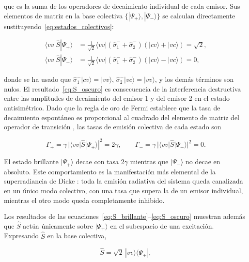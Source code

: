 que es la suma de los operadores de decaimiento individual de cada emisor. Sus elementos de matriz en la base colectiva $\{|\Psi_+\rangle, |\Psi_-\rangle\}$ se calculan directamente sustituyendo~\eqref{eq:estados_colectivos}:

\begin{align}
	\langle vv|\hat{S}|\Psi_+\rangle
	&= \frac{1}{\sqrt{2}}\langle vv|
	\left(\hat{\sigma}_1^- + \hat{\sigma}_2^-\right)
	\left(|cv\rangle + |vc\rangle\right)
	= \sqrt{2},
	\label{eq:S_brillante}\\[4pt]
	\langle vv|\hat{S}|\Psi_-\rangle
	&= \frac{1}{\sqrt{2}}\langle vv|
	\left(\hat{\sigma}_1^- + \hat{\sigma}_2^-\right)
	\left(|cv\rangle - |vc\rangle\right)
	= 0,
	\label{eq:S_oscuro}
\end{align}

donde se ha usado que $\hat{\sigma}_1^-|cv\rangle = |vv\rangle$, $\hat{\sigma}_2^-|vc\rangle = |vv\rangle$, y los demás términos son nulos. El resultado~\eqref{eq:S_oscuro} es consecuencia de la interferencia destructiva entre las amplitudes de decaimiento del emisor 1 y del emisor 2 en el estado antisimétrico. Dado que la regla de oro de Fermi establece que la tasa de decaimiento espontáneo es proporcional al cuadrado del elemento de matriz del operador de transición \cite{fox2006}, las tasas de emisión colectiva  de cada estado son

\begin{equation}
	\Gamma_+ = \gamma\,|\langle vv|\hat{S}|\Psi_+\rangle|^2 = 2\gamma,
	\qquad
	\Gamma_- = \gamma\,|\langle vv|\hat{S}|\Psi_-\rangle|^2 = 0.
	\label{eq:tasas_colectivas}
\end{equation}

El estado brillante $|\Psi_+\rangle$ decae con tasa $2\gamma$ mientras que $|\Psi_-\rangle$ no decae en absoluto. Este comportamiento es la manifestación más elemental de la superradiancia de Dicke \cite{dicke1954}: toda la emisión radiativa del sistema queda canalizada en un único modo colectivo, con una tasa que supera la de un emisor individual, mientras el otro modo queda completamente inhibido.

Los resultados de las ecuaciones~\eqref{eq:S_brillante}--\eqref{eq:S_oscuro} muestran además que $\hat{S}$ actúa únicamente sobre $|\Psi_+\rangle$ en el subespacio de una excitación. Expresando $\hat{S}$ en la base colectiva,

\begin{equation}
	\hat{S} = \sqrt{2}\,|vv\rangle\langle\Psi_+|,
	\label{eq:S_descomposicion}
\end{equation}

